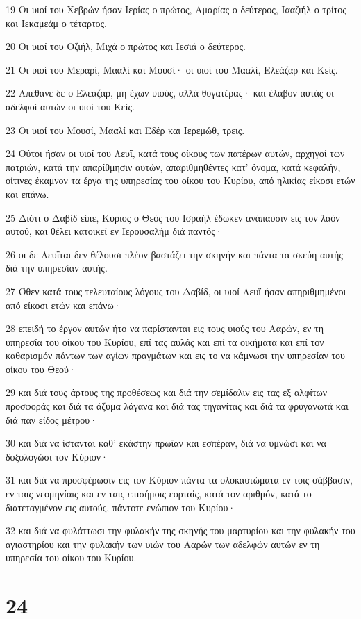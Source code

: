 \par 19 Οι υιοί του Χεβρών ήσαν Ιερίας ο πρώτος, Αμαρίας ο δεύτερος, Ιααζιήλ ο τρίτος και Ιεκαμεάμ ο τέταρτος.
\par 20 Οι υιοί του Οζιήλ, Μιχά ο πρώτος και Ιεσιά ο δεύτερος.
\par 21 Οι υιοί του Μεραρί, Μααλί και Μουσί· οι υιοί του Μααλί, Ελεάζαρ και Κείς.
\par 22 Απέθανε δε ο Ελεάζαρ, μη έχων υιούς, αλλά θυγατέρας· και έλαβον αυτάς οι αδελφοί αυτών οι υιοί του Κείς.
\par 23 Οι υιοί του Μουσί, Μααλί και Εδέρ και Ιερεμώθ, τρεις.
\par 24 Ούτοι ήσαν οι υιοί του Λευΐ, κατά τους οίκους των πατέρων αυτών, αρχηγοί των πατριών, κατά την απαρίθμησιν αυτών, απαριθμηθέντες κατ' όνομα, κατά κεφαλήν, οίτινες έκαμνον τα έργα της υπηρεσίας του οίκου του Κυρίου, από ηλικίας είκοσι ετών και επάνω.
\par 25 Διότι ο Δαβίδ είπε, Κύριος ο Θεός του Ισραήλ έδωκεν ανάπαυσιν εις τον λαόν αυτού, και θέλει κατοικεί εν Ιερουσαλήμ διά παντός·
\par 26 οι δε Λευΐται δεν θέλουσι πλέον βαστάζει την σκηνήν και πάντα τα σκεύη αυτής διά την υπηρεσίαν αυτής.
\par 27 Όθεν κατά τους τελευταίους λόγους του Δαβίδ, οι υιοί Λευΐ ήσαν απηριθμημένοι από είκοσι ετών και επάνω·
\par 28 επειδή το έργον αυτών ήτο να παρίστανται εις τους υιούς του Ααρών, εν τη υπηρεσία του οίκου του Κυρίου, επί τας αυλάς και επί τα οικήματα και επί τον καθαρισμόν πάντων των αγίων πραγμάτων και εις το να κάμνωσι την υπηρεσίαν του οίκου του Θεού·
\par 29 και διά τους άρτους της προθέσεως και διά την σεμίδαλιν εις τας εξ αλφίτων προσφοράς και διά τα άζυμα λάγανα και διά τας τηγανίτας και διά τα φρυγανωτά και διά παν είδος μέτρου·
\par 30 και διά να ίστανται καθ' εκάστην πρωΐαν και εσπέραν, διά να υμνώσι και να δοξολογώσι τον Κύριον·
\par 31 και διά να προσφέρωσιν εις τον Κύριον πάντα τα ολοκαυτώματα εν τοις σάββασιν, εν ταις νεομηνίαις και εν ταις επισήμοις εορταίς, κατά τον αριθμόν, κατά το διατεταγμένον εις αυτούς, πάντοτε ενώπιον του Κυρίου·
\par 32 και διά να φυλάττωσι την φυλακήν της σκηνής του μαρτυρίου και την φυλακήν του αγιαστηρίου και την φυλακήν των υιών του Ααρών των αδελφών αυτών εν τη υπηρεσία του οίκου του Κυρίου.

\chapter{24}

